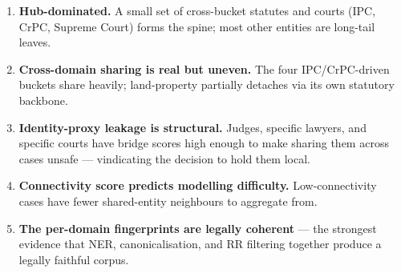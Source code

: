 \begin{enumerate}
  \item \textbf{Hub-dominated.} A small set of cross-bucket statutes and courts (IPC, CrPC, Supreme Court) forms the spine; most other entities are long-tail leaves.
  \item \textbf{Cross-domain sharing is real but uneven.} The four IPC/CrPC-driven buckets share heavily; land-property partially detaches via its own statutory backbone.
  \item \textbf{Identity-proxy leakage is structural.} Judges, specific lawyers, and specific courts have bridge scores high enough to make sharing them across cases unsafe --- vindicating the decision to hold them local.
  \item \textbf{Connectivity score predicts modelling difficulty.} Low-connectivity cases have fewer shared-entity neighbours to aggregate from.
  \item \textbf{The per-domain fingerprints are legally coherent} --- the strongest evidence that NER, canonicalisation, and RR filtering together produce a legally faithful corpus.
\end{enumerate}
